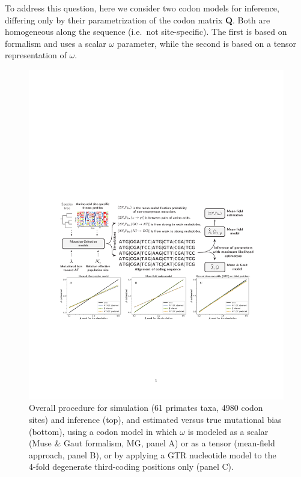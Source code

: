 \documentclass{article}
\newcommand{\BiDimArray}[1]{\bm{#1}}
\newcommand{\submatrix}{Q}
\newcommand{\Submatrix}{\BiDimArray{\submatrix}}
\begin{document}
To address this question, here we consider two codon models for inference, differing only by their parametrization of the codon matrix $\Submatrix$.
Both are homogeneous along the sequence (i.e.~not site-specific).
The first is based on \citet{Muse1994} formalism and uses a scalar $\omega$ parameter, while the second is based on a tensor representation of $\omega$.

\begin{figure}[!htb]
 \centering
 \includegraphics[width=\linewidth, page=1]{figure2}
 \caption[Estimation of mutational bias]{
  Overall procedure for simulation (61 primates taxa, 4980 codon sites) and inference (top), and estimated versus true mutational bias (bottom), using a codon model in which $\omega$ is modeled as a scalar (Muse \& Gaut formalism, MG, panel A) or as a tensor (mean-field approach, panel B), or by applying a GTR nucleotide model to the 4-fold degenerate third-coding positions only (panel C).
 }
 \label{fig:mut-bias-inference}
\end{figure}
\end{document}
